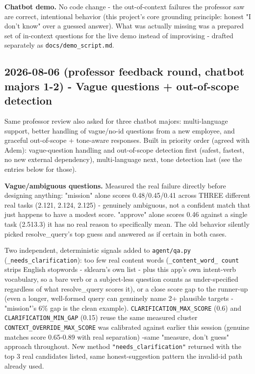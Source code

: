 \textbf{Chatbot demo.} No code change - the out-of-context failures the professor saw are correct, intentional behavior (this project's core grounding principle: honest "I don't know" over a guessed answer). What was actually missing was a prepared set of in-context questions for the live demo instead of improvising - drafted separately as \texttt{docs/\allowbreak{}demo\_\allowbreak{}script.md}.

\subsection*{2026-08-06 (professor feedback round, chatbot majors 1-2) - Vague questions + out-of-scope detection}
Same professor review also asked for three chatbot majors: multi-language support, better handling of vague/no-id questions from a new employee, and graceful out-of-scope + tone-aware responses. Built in priority order (agreed with Adem): vague-question handling and out-of-scope detection first (safest, fastest, no new external dependency), multi-language next, tone detection last (see the entries below for those).

\textbf{Vague/ambiguous questions.} Measured the real failure directly before designing anything: "mission" alone scores 0.48/0.45/0.41 across THREE different real tasks (2.121, 2.124, 2.125) - genuinely ambiguous, not a confident match that just happens to have a modest score. "approve" alone scores 0.46 against a single task (2.513.3) it has no real reason to specifically mean. The old behavior silently picked resolve\_query's top guess and answered as if certain in both cases.

Two independent, deterministic signals added to \texttt{agent/\allowbreak{}qa.py} (\texttt{\_\allowbreak{}needs\_\allowbreak{}clarification}): too few real content words (\texttt{\_\allowbreak{}content\_\allowbreak{}word\_\allowbreak{} count} strips English stopwords - sklearn's own list - plus this app's own intent-verb vocabulary, so a bare verb or a subject-less question counts as under-specified regardless of what resolve\_query scores it), or a close score gap to the runner-up (even a longer, well-formed query can genuinely name 2+ plausible targets -"mission"'s 6\% gap is the clean example). \texttt{CLARIFICATION\_\allowbreak{}MAX\_\allowbreak{}SCORE} (0.6) and \texttt{CLARIFICATION\_\allowbreak{}MIN\_\allowbreak{}GAP} (0.15) reuse the same measured cluster \texttt{CONTEXT\_\allowbreak{}OVERRIDE\_\allowbreak{}MAX\_\allowbreak{}SCORE} was calibrated against earlier this session (genuine matches score 0.65-0.89 with real separation) -same "measure, don't guess" approach throughout. New method \texttt{"needs\_\allowbreak{}clarification"} returned with the top 3 real candidates listed, same honest-suggestion pattern the invalid-id path already used.

